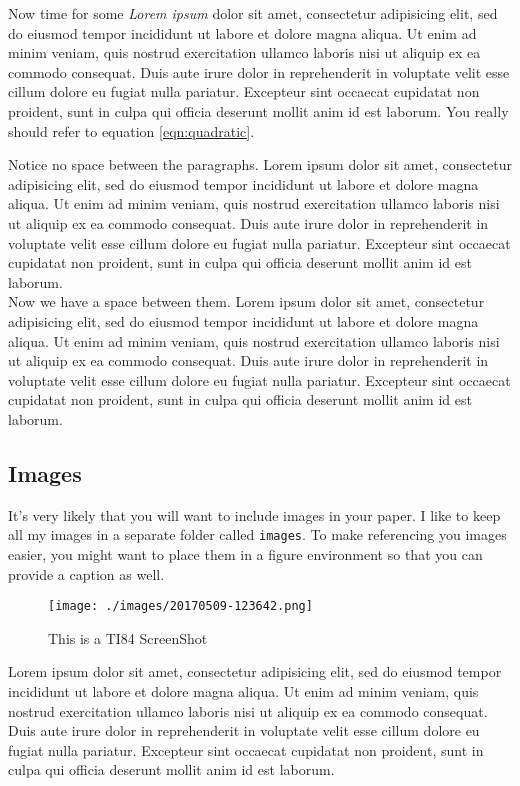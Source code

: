 \documentclass[a4paper,12pt]{article}
\begin{document}
Now time for some \textit{Lorem ipsum} dolor sit amet, consectetur adipisicing elit, sed do eiusmod tempor incididunt ut labore et dolore magna aliqua. Ut enim ad minim veniam, quis nostrud exercitation ullamco laboris nisi ut aliquip ex ea commodo consequat. Duis aute irure dolor in reprehenderit in voluptate velit esse cillum dolore eu fugiat nulla pariatur. Excepteur sint occaecat cupidatat non proident, sunt in culpa qui officia deserunt mollit anim id est laborum. You really should refer to equation \ref{eqn:quadratic}.

Notice no space between the paragraphs.  Lorem ipsum dolor sit amet, consectetur adipisicing elit, sed do eiusmod tempor incididunt ut labore et dolore magna aliqua. Ut enim ad minim veniam, quis nostrud exercitation ullamco laboris nisi ut aliquip ex ea commodo consequat. Duis aute irure dolor in reprehenderit in voluptate velit esse cillum dolore eu fugiat nulla pariatur. Excepteur sint occaecat cupidatat non proident, sunt in culpa qui officia deserunt mollit anim id est laborum.\\

Now we have a space between them. Lorem ipsum dolor sit amet, consectetur adipisicing elit, sed do eiusmod tempor incididunt ut labore et dolore magna aliqua. Ut enim ad minim veniam, quis nostrud exercitation ullamco laboris nisi ut aliquip ex ea commodo consequat. Duis aute irure dolor in reprehenderit in voluptate velit esse cillum dolore eu fugiat nulla pariatur. Excepteur sint occaecat cupidatat non proident, sunt in culpa qui officia deserunt mollit anim id est laborum.

\subsection*{Images}\label{subsec:images}

It's very likely that you will want to include images in your paper.  I like to keep all my images in a separate folder called \texttt{images}.  To make referencing you images easier, you might want to place them in a figure environment so that you can provide a caption as well.

\begin{figure}[ht!]
  \centering
  \texttt{[image: ./images/20170509-123642.png]}
  \caption{This is a TI84 ScreenShot}\label{img:ti84screenshot1}
\end{figure}

Lorem ipsum dolor sit amet, consectetur adipisicing elit, sed do eiusmod tempor incididunt ut labore et dolore magna aliqua. Ut enim ad minim veniam, quis nostrud exercitation ullamco laboris nisi ut aliquip ex ea commodo consequat. Duis aute irure dolor in reprehenderit in voluptate velit esse cillum dolore eu fugiat nulla pariatur. Excepteur sint occaecat cupidatat non proident, sunt in culpa qui officia deserunt mollit anim id est laborum.
\end{document}
